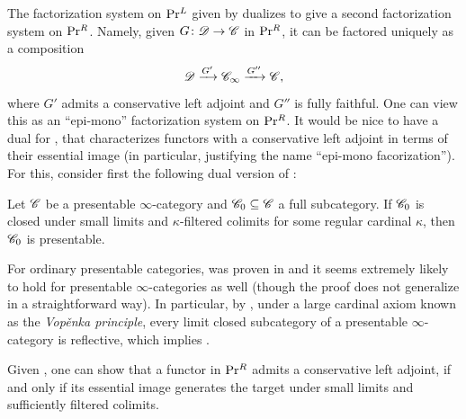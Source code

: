 \documentclass[english]{article}
\begin{document}
The factorization system on $\mathrm{Pr}{}^L$ given by  dualizes  to give a second factorization system on $\mathrm{Pr}{}^R$. Namely, given $G\colon \mathscr{D} \to \mathscr{C}$ in $\mathrm{Pr}{}^R$, it can be factored uniquely as a composition
\[
    \mathscr{D} \xrightarrow{G'} \mathscr{C}_\infty \xrightarrow{G''} \mathscr{C},  
\]
where $G'$ admits a conservative left adjoint and $G''$ is fully faithful. One can view this as an ``epi-mono'' factorization system on $\mathrm{Pr}{}^R$. It would be nice to have a dual for , that characterizes functors with a conservative left adjoint in terms of their essential image (in particular, justifying the name ``epi-mono facorization''). For this, consider first the following dual version of :


\begin{conj}\label{Shauli_Thesis}
    Let $\mathscr{C}$ be a presentable $\infty$-category and $\mathscr{C}_0\subseteq \mathscr{C}$ a full subcategory. If $\mathscr{C}_0$ is closed under small limits and $\kappa$-filtered colimits for some regular cardinal $\kappa$, then $\mathscr{C}_0$ is presentable. 
\end{conj}

\begin{rem}
    For ordinary presentable categories,  was proven in \cite{adamek1989reflections} and it seems extremely likely to hold for presentable $\infty$-categories as well (though the proof does not generalize in a straightforward way). In particular, by \cite{rosicky2003left}, under a large cardinal axiom known as the \textit{Vop\v{e}nka principle}, every limit closed subcategory of a presentable $\infty$-category is reflective, which implies .
\end{rem}

Given , one can show that a functor in $\mathrm{Pr}{}^R$ admits a conservative left adjoint, if and only if its essential image generates the target under small limits and sufficiently filtered colimits.
\end{document}
